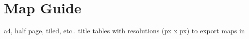 \section{Map Guide}
a4, half page, tiled, etc.. title
tables with resolutions (px x px) to export maps in

